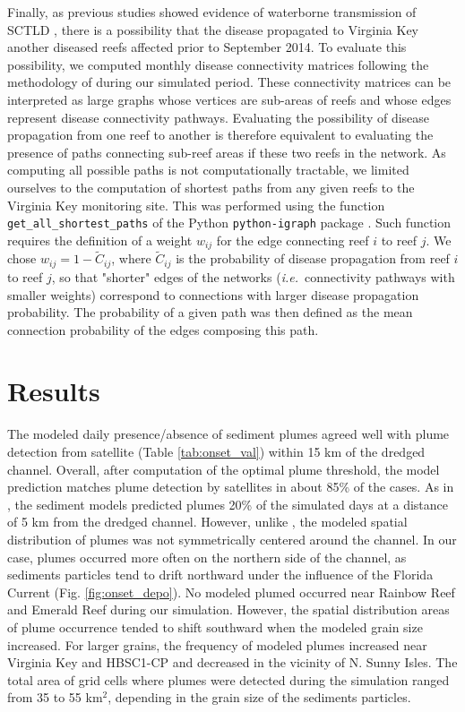 \documentclass[preprint,12pt,authoryear]{elsarticle}
\newcommand{\ie}{{\it i.e.}\ }
\begin{document}
Finally, as previous studies showed evidence of waterborne transmission of SCTLD \citep{aeby2019pathogenesis, dobbelaere2020coupled,eaton2021measuring, meiling2021variable}, there is a possibility that the disease propagated to Virginia Key another diseased reefs affected prior to September 2014. To evaluate this possibility, we computed monthly disease connectivity matrices following the methodology of \cite{dobbelaere2020coupled} during our simulated period. These connectivity matrices can be interpreted as large graphs whose vertices are sub-areas of reefs and whose edges represent disease connectivity pathways. Evaluating the possibility of disease propagation from one reef to another is therefore equivalent to evaluating the presence of paths connecting sub-reef areas if these two reefs in the network. As computing all possible paths is not computationally tractable, we limited ourselves to the computation of shortest paths from any given reefs to the Virginia Key monitoring site. This was performed using the function \texttt{get\_all\_shortest\_paths} of the Python \texttt{python-igraph} package \citep{csardi2006igraph}. Such function requires the definition of a weight $w_{ij}$ for the edge connecting reef $i$ to reef $j$. We chose $w_{ij} = 1-\tilde{C}_{ij}$, where $\tilde{C}_{ij}$ is the probability of disease propagation from reef $i$ to reef $j$, so that "shorter" edges of the networks (\ie connectivity pathways with smaller weights) correspond to connections with larger disease propagation probability. The probability of a given path was then defined as the mean connection probability of the edges composing this path.
  
\section{Results}

The modeled daily presence/absence of sediment plumes agreed well with plume detection from satellite (Table \ref{tab:onset_val}) within 15 km of the dredged channel. Overall, after computation of the optimal plume threshold, the model prediction matches plume detection by satellites in about 85\% of the cases. As in \cite{cunning2019extensive}, the sediment models predicted plumes 20\% of the simulated days at a distance of 5 km from the dredged channel. However, unlike \cite{cunning2019extensive}, the modeled spatial distribution of plumes was not symmetrically centered around the channel. In our case, plumes occurred more often on the northern side of the channel, as sediments particles tend to drift northward under the influence of the Florida Current (Fig. \ref{fig:onset_depo}). No modeled plumed occurred near Rainbow Reef and Emerald Reef during our simulation. However, the spatial distribution areas of plume occurrence tended to shift southward when the modeled grain size increased. For larger grains, the frequency of modeled plumes increased near Virginia Key and HBSC1-CP and decreased in the vicinity of N. Sunny Isles. The total area of grid cells where plumes were detected during the simulation ranged from 35 to 55 km$^2$, depending in the grain size of the sediments particles.
\end{document}
